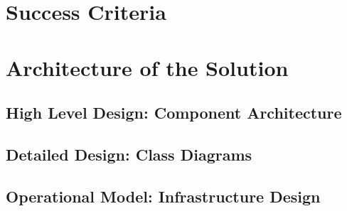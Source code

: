 \documentclass[12pt]{article} %
\begin{document}
	
	

	
	
	
	\section{Success Criteria} %
	
	
	\section{Architecture of the Solution}
		
	\subsection{High Level Design: Component Architecture}
	
	\subsection{Detailed Design: Class Diagrams}
	
	\subsection{Operational Model: Infrastructure Design}
	
	
	
	
	
	
	
\end{document}
